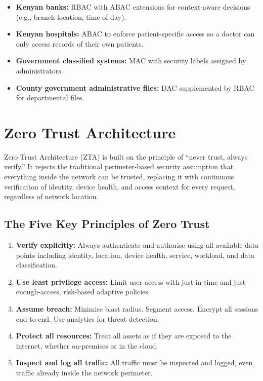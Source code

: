\documentclass[12pt,a4paper]{article}
\begin{document}
\begin{itemize}
    \item \textbf{Kenyan banks:} RBAC with ABAC extensions for context-aware decisions (e.g., branch location, time of day).
    \item \textbf{Kenyan hospitals:} ABAC to enforce patient-specific access so a doctor can only access records of their own patients.
    \item \textbf{Government classified systems:} MAC with security labels assigned by administrators.
    \item \textbf{County government administrative files:} DAC supplemented by RBAC for departmental files.
\end{itemize}

\section{Zero Trust Architecture}

Zero Trust Architecture (ZTA) is built on the principle of ``never trust, always verify.'' It rejects the traditional perimeter-based security assumption that everything inside the network can be trusted, replacing it with continuous verification of identity, device health, and access context for every request, regardless of network location.

\subsection{The Five Key Principles of Zero Trust}

\begin{enumerate}
    \item \textbf{Verify explicitly:} Always authenticate and authorise using all available data points including identity, location, device health, service, workload, and data classification.
    \item \textbf{Use least privilege access:} Limit user access with just-in-time and just-enough-access, risk-based adaptive policies.
    \item \textbf{Assume breach:} Minimise blast radius. Segment access. Encrypt all sessions end-to-end. Use analytics for threat detection.
    \item \textbf{Protect all resources:} Treat all assets as if they are exposed to the internet, whether on-premises or in the cloud.
    \item \textbf{Inspect and log all traffic:} All traffic must be inspected and logged, even traffic already inside the network perimeter.
\end{enumerate}
\end{document}
